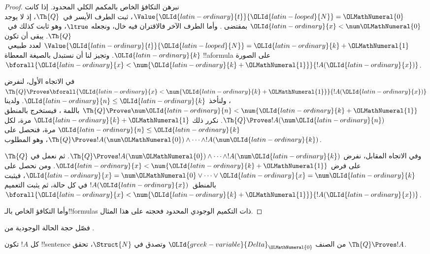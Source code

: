 \documentclass[../../../include/open-logic-section]{subfiles}
\begin{document}
\begin{proof}
نبرهن التكافؤ الخاص بالمكمم الكلي المحدود.
إذا كانت $\Value{\OLId{latin-ordinary}{t}}{\OLId{latin-looped}{N}}=\OLMathNumeral{0}$، ثبت الطرف الأيسر في~$\Th{Q}$،
إذ لا يوجد $\OLId{latin-ordinary}{x}<\num \OLMathNumeral{0}$ بمقتضى
.
وأما الطرف الآخر فالاقتران فيه خال، ونجعله $\ltrue$،
وهو ثابت كذلك في~$\Th{Q}$.
%
يبقى أن تكون $\Value{\OLId{latin-ordinary}{t}}{\OLId{latin-looped}{N}}=\OLId{latin-ordinary}{k}+\OLMathNumeral{1}$ لعدد طبيعي~$\OLId{latin-ordinary}{k}$.
وتجيز لنا  أن نستبدل بالصيغة المعطاة
!!a{formula} على الصورة $\bforall{\OLId{latin-ordinary}{x}<\num{\OLId{latin-ordinary}{k}+\OLMathNumeral{1}}}{!A(\OLId{latin-ordinary}{x})}$.

في الاتجاه الأول، لنفرض
$\Th{Q}\Proves\bforall{\OLId{latin-ordinary}{x}<\num{\OLId{latin-ordinary}{k}+\OLMathNumeral{1}}}{!A(\OLId{latin-ordinary}{x})}$،
ولنأخذ $\OLId{latin-ordinary}{n}\leq \OLId{latin-ordinary}{k}$.
ولدينا $\Th{Q}\Proves\num \OLId{latin-ordinary}{n}<\num{\OLId{latin-ordinary}{k}+\OLMathNumeral{1}}$
باللمة ،
فيستخرج بالمنطق $\Th{Q}\Proves !A(\num \OLId{latin-ordinary}{n})$.
نكرر ذلك $\OLId{latin-ordinary}{k}+\OLMathNumeral{1}$ مرة، لكل $\OLId{latin-ordinary}{n}\leq \OLId{latin-ordinary}{k}$ مرة،
فنحصل على $\Th{Q}\Proves !A(\num \OLMathNumeral{0})\land\dots\land !A(\num \OLId{latin-ordinary}{k})$،
وهو المطلوب.

وفي الاتجاه المقابل، نفرض
$\Th{Q}\Proves !A(\num \OLMathNumeral{0})\land\dots\land !A(\num \OLId{latin-ordinary}{k})$.
ثم نعمل في $\Th{Q}$ على فرض $\OLId{latin-ordinary}{x}<\num{\OLId{latin-ordinary}{k}+\OLMathNumeral{1}}$.
ومن  نحصل على
$\OLId{latin-ordinary}{x}=\num \OLMathNumeral{0}\lor\dots\lor \OLId{latin-ordinary}{x}=\num \OLId{latin-ordinary}{k}$،
فيثبت بالمنطق~$!A(\OLId{latin-ordinary}{x})$ في كل حالة، ثم يثبت التعميم
$\bforall{\OLId{latin-ordinary}{x}<\num{\OLId{latin-ordinary}{k}+\OLMathNumeral{1}}}{!A(\OLId{latin-ordinary}{x})}$.

وأما التكافؤ الخاص بالـ!!{formula}s ذات التكميم الوجودي المحدود
فحجته على هذا المثال.
\end{proof}

\begin{prob}
فصّل حجة الحالة الوجودية من
.
\end{prob}

\begin{lem}
كل $!A$ تكون !!{sentence} من الصنف $\OLId{greek-variable}{Delta}_\OLMathNumeral{0}$ وتصدق في
$\Struct{N}$، تحقق $\Th{Q}\Proves !A$.
\end{lem}
\end{document}
